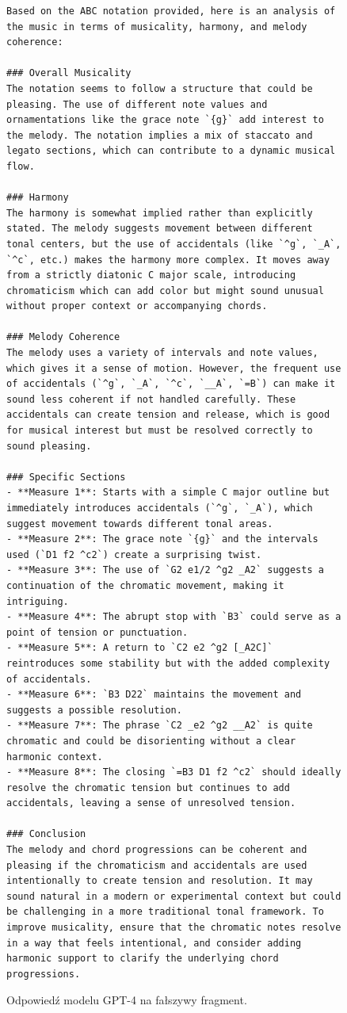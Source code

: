 \documentclass[data-science]{agh-wi} %
\begin{document}
\begin{figure}[ht!]
    \begin{verbatim}
Based on the ABC notation provided, here is an analysis of the music in terms of musicality, harmony, and melody coherence:

### Overall Musicality
The notation seems to follow a structure that could be pleasing. The use of different note values and ornamentations like the grace note `{g}` add interest to the melody. The notation implies a mix of staccato and legato sections, which can contribute to a dynamic musical flow.

### Harmony
The harmony is somewhat implied rather than explicitly stated. The melody suggests movement between different tonal centers, but the use of accidentals (like `^g`, `_A`, `^c`, etc.) makes the harmony more complex. It moves away from a strictly diatonic C major scale, introducing chromaticism which can add color but might sound unusual without proper context or accompanying chords.

### Melody Coherence
The melody uses a variety of intervals and note values, which gives it a sense of motion. However, the frequent use of accidentals (`^g`, `_A`, `^c`, `__A`, `=B`) can make it sound less coherent if not handled carefully. These accidentals can create tension and release, which is good for musical interest but must be resolved correctly to sound pleasing. 

### Specific Sections
- **Measure 1**: Starts with a simple C major outline but immediately introduces accidentals (`^g`, `_A`), which suggest movement towards different tonal areas.
- **Measure 2**: The grace note `{g}` and the intervals used (`D1 f2 ^c2`) create a surprising twist.
- **Measure 3**: The use of `G2 e1/2 ^g2 _A2` suggests a continuation of the chromatic movement, making it intriguing.
- **Measure 4**: The abrupt stop with `B3` could serve as a point of tension or punctuation.
- **Measure 5**: A return to `C2 e2 ^g2 [_A2C]` reintroduces some stability but with the added complexity of accidentals.
- **Measure 6**: `B3 D22` maintains the movement and suggests a possible resolution.
- **Measure 7**: The phrase `C2 _e2 ^g2 __A2` is quite chromatic and could be disorienting without a clear harmonic context.
- **Measure 8**: The closing `=B3 D1 f2 ^c2` should ideally resolve the chromatic tension but continues to add accidentals, leaving a sense of unresolved tension.

### Conclusion
The melody and chord progressions can be coherent and pleasing if the chromaticism and accidentals are used intentionally to create tension and resolution. It may sound natural in a modern or experimental context but could be challenging in a more traditional tonal framework. To improve musicality, ensure that the chromatic notes resolve in a way that feels intentional, and consider adding harmonic support to clarify the underlying chord progressions.
\end{verbatim}
    \caption{Odpowiedź modelu GPT-4 na fałszywy fragment.}\label{code:gpt4bad}
\end{figure}
\end{document}
